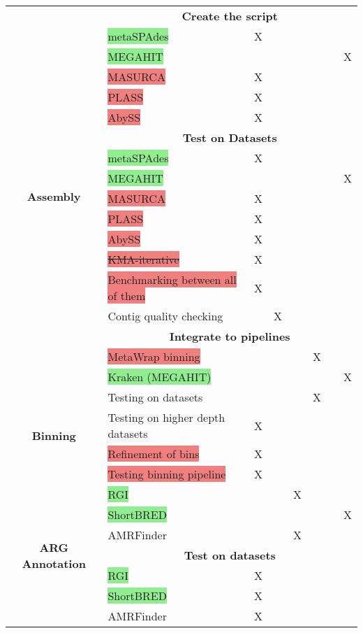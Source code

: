 \documentclass[11pt]{report}
\newcommand{\highlightessential}[1]{\colorbox{lightgreen}{#1}}
\newcommand{\highlightoptional}[1]{\colorbox{lightorange}{#1}}
\newcommand{\highlightrobust}[1]{\colorbox{lightcoral}{#1}}
\newcommand{\deprecated}[1]{\sout{#1}}
\begin{document}
\begin{longtable}{|c|p{8cm}|c|c|c|c|c|c|}
	
	\multirow{18}{*}{\textbf{Assembly}} 
	& \multicolumn{7}{c|}{\textbf{Create the script}} \\
	& \highlightessential{metaSPAdes} & X & & & & & \\ 
	& \highlightessential{MEGAHIT} & & & & & & X \\
	& \highlightrobust{MASURCA} & X & & & & & \\ 
	& \highlightrobust{PLASS} & X & & & & & \\ 
	& \highlightrobust{AbySS} & X & & & & & \\ 
	& \multicolumn{7}{c|}{\textbf{Test on Datasets}} \\
	& \highlightessential{metaSPAdes} & X & & & & & \\ 
	& \highlightessential{MEGAHIT} & & & & & & X \\ 
	& \highlightrobust{MASURCA} & X & & & & & \\ 
	& \highlightrobust{PLASS} & X & & & & & \\ 
	& \highlightrobust{AbySS} & X & & & & & \\ 
	& \highlightrobust{\deprecated{KMA-iterative}} & X & & & & & \\
	& \highlightrobust{Benchmarking between all of them} & X & & & & & \\
	& \highlightoptional{Contig quality checking} & & X & & & & \\ 
	& \multicolumn{7}{c|}{\textbf{Integrate to pipelines}} \\
	& \highlightrobust{MetaWrap binning} & & & & X & & \\
	& \highlightessential{Kraken (MEGAHIT)} & & & & & & X \\ \hline
	
	\multirow{4}{*}{\textbf{Binning}} 
	& \highlightoptional{Testing on datasets} & & & & X & & \\
	& \highlightoptional{Testing on higher depth datasets} & X & & & & & \\
	& \highlightrobust{Refinement of bins} & X & & & & & \\ 
	& \highlightrobust{Testing binning pipeline} & X & & & & & \\ \hline
	
	\multirow{7}{*}{\textbf{ARG Annotation}} 
	& \highlightessential{RGI} & & & X & & & \\ 
	& \highlightessential{ShortBRED} & & & & & & X \\
	& \highlightoptional{AMRFinder} & & & X & & & \\ 
	& \multicolumn{7}{c|}{\textbf{Test on datasets}} \\
	& \highlightessential{RGI} & X & & & & & \\
	& \highlightessential{ShortBRED} & X & & & & & \\
	& \highlightoptional{AMRFinder} & X & & & & & \\ \hline
	
\end{longtable}
\end{document}
